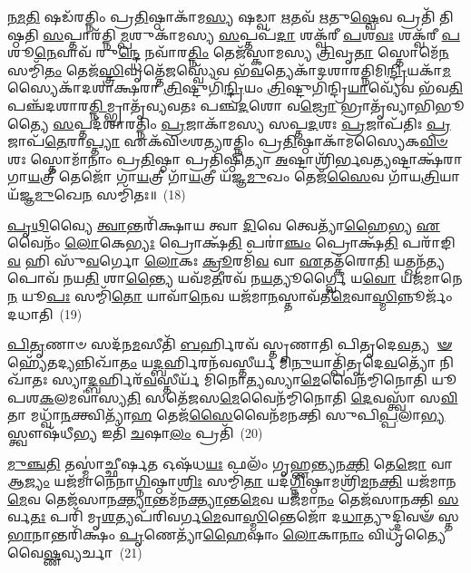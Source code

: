 \-\ul{𑌨}\-\-\ul{𑌮}\-\-\ul{𑌤𑌿} 𑌷𑌡᳴𑌰𑌤𑍍𑌨𑌿𑌂 𑌪𑍍𑌰\-\ul{𑌤𑌿}\-𑌷𑍍𑌠𑌾𑌕𑌾᳴𑌮\-\ul{𑌸𑍍𑌯} 𑌷𑌡𑍍𑌵𑌾 \ul{𑌋}\-𑌤𑌵᳴ \ul{𑌋}\-𑌤𑍁\-\ul{𑌷𑍍𑌵𑍇}\-𑌵 𑌪𑍍𑌰𑌤𑌿᳴ 𑌤𑌿𑌷𑍍𑌠𑌤𑌿 \ul{𑌸}\-𑌪𑍍𑌤𑌾𑌰᳴𑌤𑍍𑌨𑌿\-\ul{𑌮𑍍𑌪}\-𑌶𑍁𑌕𑌾᳴𑌮𑌸𑍍𑌯 \ul{𑌸}\-𑌪𑍍𑌤𑌪᳴\-\ul{𑌦𑌾} 𑌶𑌕𑍍𑌵᳴𑌰𑍀 \ul{𑌪}\-𑌶\-\ul{𑌵𑌃} 𑌶𑌕𑍍𑌵᳴𑌰𑍀 \ul{𑌪}\-𑌶𑍂\-\ul{𑌨𑍇}\-𑌵𑌾𑌵᳴ 𑌰𑍁\-\ul{𑌨𑍍𑌦𑍍𑌧𑍇} 𑌨𑌵𑌾᳴𑌰\-\ul{𑌤𑍍𑌨𑌿𑌂} 𑌤𑍇𑌜᳴𑌸𑍍𑌕𑌾𑌮𑌸𑍍𑌯 \ul{𑌤𑍍𑌰𑌿}\-𑌵𑍃\-\ul{𑌤𑌾} 𑌸𑍍𑌤𑍋𑌮𑍇᳴\-\ul{𑌨} 𑌸𑌮𑍍𑌮𑌿᳴\-\ul{𑌤𑌂} 𑌤𑍇𑌜᳴\-\ul{𑌸𑍍𑌤𑍍𑌰𑌿}\-𑌵𑍃𑌤𑍍𑌤𑍇᳴\-\ul{𑌜}\-𑌸𑍍𑌵𑍍𑌯𑍇᳴𑌵 𑌭᳴\-\ul{𑌵}\-𑌤𑍍𑌯𑍇𑌕𑌾᳴\-𑌦𑌶𑌾𑌰𑌤𑍍𑌨𑌿\-𑌮𑌿\-\ul{𑌨𑍍𑌦𑍍𑌰𑌿}\-𑌯𑌕𑌾᳴\-\ul{𑌮}\-𑌸𑍍𑌯𑍈𑌕𑌾᳴\-𑌦𑌶𑌾𑌕𑍍𑌷𑌰𑌾 \ul{𑌤𑍍𑌰𑌿}\-𑌷𑍍𑌟𑍁𑌗𑌿᳴\-\ul{𑌨𑍍𑌦𑍍𑌰𑌿}\-𑌯𑌂 \ul{𑌤𑍍𑌰𑌿}\-𑌷𑍍𑌟𑍁𑌗𑌿᳴𑌨𑍍𑌦𑍍𑌰𑌿\-\ul{𑌯𑌾}\-𑌵𑍍𑌯𑍇᳴𑌵 𑌭᳴𑌵\-\ul{𑌤𑌿} 𑌪𑌞𑍍𑌚᳴𑌦𑌶𑌾𑌰\-\ul{𑌤𑍍𑌨𑌿}\-𑌮𑍍𑌭𑍍𑌰𑌾𑌤𑍃᳴𑌵𑍍𑌯𑌵𑌤𑌃 𑌪𑌞𑍍𑌚\-\ul{𑌦}\-𑌶𑍋 𑌵\-\ul{𑌜𑍍𑌰𑍋} 𑌭𑍍𑌰𑌾𑌤𑍃᳴𑌵𑍍𑌯𑌾𑌭𑌿𑌭𑍂𑌤𑍍𑌯𑍈 \ul{𑌸}\-𑌪𑍍𑌤𑌦᳴𑌶𑌾𑌰𑌤𑍍𑌨𑌿𑌂 \ul{𑌪𑍍𑌰}\-𑌜𑌾𑌕𑌾᳴𑌮𑌸𑍍𑌯 𑌸𑌪𑍍𑌤\-\ul{𑌦}\-𑌶𑌃 \ul{𑌪𑍍𑌰}\-𑌜𑌾𑌪᳴𑌤𑌿𑌃 \ul{𑌪𑍍𑌰}\-𑌜𑌾𑌪᳴\-\ul{𑌤𑍇}\-𑌰𑌾\-\ul{𑌪𑍍𑌤𑍍𑌯𑌾} 𑌏𑌕᳴𑌵𑌿𑍞𑌶𑌤𑍍𑌯𑌰𑌤𑍍𑌨𑌿𑌂 𑌪𑍍𑌰\-\ul{𑌤𑌿}\-𑌷𑍍𑌠𑌾𑌕𑌾᳴𑌮𑌸𑍍𑌯𑍈𑌕\-\-\ul{𑌵𑌿}\-\-\ul{𑍞}\-𑌶𑌃 𑌸𑍍𑌤𑍋𑌮𑌾᳴𑌨𑌾𑌂 𑌪𑍍𑌰\-\ul{𑌤𑌿}\-𑌷𑍍𑌠𑌾 𑌪𑍍𑌰𑌤𑌿᳴𑌷𑍍𑌠𑌿𑌤𑍍𑌯𑌾 \ul{𑌅}\-𑌷𑍍𑌟𑌾𑌶𑍍𑌰𑌿᳴𑌰𑍍𑌭𑌵\-\ul{𑌤𑍍𑌯}\-𑌷𑍍𑌟𑌾𑌕𑍍𑌷᳴𑌰𑌾 𑌗𑌾\-\ul{𑌯}\-𑌤𑍍𑌰𑍀 𑌤𑍇𑌜𑍋᳴ 𑌗𑌾\-\ul{𑌯}\-𑌤𑍍𑌰𑍀 𑌗𑌾᳴\-\ul{𑌯}\-𑌤𑍍𑌰𑍀 𑌯᳴𑌜𑍍𑌞\-\ul{𑌮𑍁}\-𑌖𑌂 𑌤𑍇𑌜᳴\-\ul{𑌸𑍈}\-𑌵 𑌗𑌾᳴𑌯\-\ul{𑌤𑍍𑌰𑌿}\-𑌯𑌾 𑌯᳴𑌜𑍍𑌞\-\ul{𑌮𑍁}\-𑌖𑍇\-\ul{𑌨} 𑌸𑌮𑍍𑌮𑌿᳴𑌤𑌃॥~(18)

{\anuvakamend[{\-\ul{𑌜𑍁}\-\-\ul{𑌷𑍇} 𑌸𑌤𑍇᳴𑌜\-\ul{𑌸}\-𑌮𑌨᳴𑌕𑍍𑌷𑌸𑌙𑍍𑌗𑌂 𑌬𑌹𑍁\-\ul{𑌶𑌾}\-𑌖𑌂 𑌵𑍃᳴𑌶𑍍𑌚𑍇\-\ul{𑌦𑍇}\-𑌷 𑌵𑍈 \ul{𑌯}\-𑌜𑍍𑌞 𑌉𑌪𑍈᳴\-\ul{𑌨}\-𑌮𑍁𑌤𑍍𑌤᳴𑌰𑍋 \ul{𑌯}\-𑌜𑍍𑌞 𑌆\-\ul{𑌪𑍍𑌤𑍍𑌯𑌾} 𑌏\-\ul{𑌕𑌾}\-𑌨𑍍𑌨𑌵𑌿𑍞᳴\-\ul{𑌶}\-𑌤𑌿𑌶𑍍𑌚᳴}]}%

\-\ul{𑌪𑍃}\-\-\ul{𑌥𑌿}\-𑌵𑍍𑌯𑍈 \ul{𑌤𑍍𑌵𑌾}\-𑌨𑍍𑌤𑌰𑌿᳴𑌕𑍍𑌷𑌾𑌯 𑌤𑍍𑌵𑌾 \ul{𑌦𑌿}\-𑌵𑍇 𑌤𑍍𑌵𑍇𑌤𑍍𑌯𑌾᳴\-\ul{𑌹𑍈}\-𑌭𑍍𑌯 \ul{𑌏}\-𑌵𑍈𑌨𑌂᳴ \ul{𑌲𑍋}\-𑌕𑍇\-\ul{𑌭𑍍𑌯𑌃} 𑌪𑍍𑌰𑍋𑌕𑍍𑌷᳴\-\ul{𑌤𑌿} 𑌪𑌰𑌾॑\-\ul{𑌞𑍍𑌚𑌂} 𑌪𑍍𑌰𑍋𑌕𑍍𑌷᳴\-\ul{𑌤𑌿} 𑌪𑌰𑌾᳴𑌙𑌿\-\ul{𑌵} 𑌹𑌿 𑌸𑍁᳴\-\ul{𑌵}\-𑌰𑍍𑌗𑍋 \ul{𑌲𑍋}\-𑌕𑌃 \ul{𑌕𑍍𑌰𑍂}\-𑌰𑌮𑌿᳴\-\ul{𑌵} 𑌵𑌾 \ul{𑌏}\-𑌤𑌤𑍍𑌕᳴𑌰𑍋\-\ul{𑌤𑌿} 𑌯𑌤𑍍𑌖𑌨᳴\-\ul{𑌤𑍍𑌯}\-𑌪𑍋𑌵᳴ 𑌨𑌯\-\ul{𑌤𑌿} 𑌶𑌾\-\ul{𑌨𑍍𑌤𑍍𑌯𑍈} 𑌯𑌵᳴𑌮\-\ul{𑌤𑍀}\-𑌰𑌵᳴ 𑌨\-\ul{𑌯}\-𑌤𑍍𑌯𑍂𑌰𑍍𑌗𑍍𑌵𑍈 𑌯\-\ul{𑌵𑍋} 𑌯𑌜᳴𑌮𑌾𑌨𑍇\-\ul{𑌨} 𑌯𑍂\-\ul{𑌪𑌃} 𑌸𑌮𑍍𑌮𑌿᳴\-\ul{𑌤𑍋} 𑌯𑌾𑌵𑌾᳴\-\ul{𑌨𑍇}\-𑌵 𑌯𑌜᳴𑌮𑌾\-\ul{𑌨}\-𑌸𑍍𑌤𑌾𑌵᳴𑌤𑍀\-\ul{𑌮𑍇}\-𑌵𑌾\-\ul{𑌸𑍍𑌮𑌿}\-𑌨𑍍𑌨𑍂𑌰𑍍𑌜𑌂᳴ 𑌦𑌧𑌾𑌤𑌿~(19)

\-\ul{𑌪𑌿}\-\-\ul{𑌤𑍃}\-𑌣𑌾𑍞 𑌸𑌦᳴𑌨\-\ul{𑌮}\-𑌸𑍀𑌤𑌿᳴ \ul{𑌬}\-𑌰𑍍\mbox{}𑌹𑌿𑌰𑌵᳴ 𑌸𑍍𑌤𑍃𑌣𑌾𑌤𑌿 𑌪𑌿𑌤𑍃𑌦𑍇\-\ul{𑌵}\-𑌤𑍍𑌯 \-\ul{𑍟} 𑌹𑍍𑌯𑍇᳴𑌤𑌦𑍍𑌯𑌨𑍍𑌨𑌿𑌖𑌾᳴\-\ul{𑌤𑌂} 𑌯\-\ul{𑌦𑍍𑌬}\-𑌰𑍍\mbox{}𑌹𑌿𑌰𑌨᳴𑌵𑌸𑍍𑌤𑍀𑌰𑍍𑌯 𑌮𑌿\-\ul{𑌨𑍁}\-𑌯𑌾𑌤𑍍𑌪𑌿᳴𑌤𑍃𑌦𑍇\-\ul{𑌵}\-𑌤𑍍𑌯𑍋᳴ 𑌨𑌿𑌖𑌾᳴𑌤𑌃 𑌸𑍍𑌯𑌾\-\ul{𑌦𑍍𑌬}\-𑌰𑍍\mbox{}𑌹𑌿𑌰᳴\-\ul{𑌵}\-𑌸𑍍𑌤𑍀𑌰𑍍𑌯᳴ 𑌮𑌿𑌨𑍋\-\ul{𑌤𑍍𑌯}\-𑌸𑍍𑌯𑌾\-\ul{𑌮𑍇}\-𑌵𑍈𑌨᳴𑌮𑍍𑌮𑌿𑌨𑍋𑌤𑌿 𑌯𑍂𑌪𑌶\-\ul{𑌕}\-𑌲𑌮𑌵𑌾॑𑌸𑍍𑌯\-\ul{𑌤𑌿} 𑌸𑌤𑍇᳴𑌜𑌸\-\ul{𑌮𑍇}\-𑌵𑍈𑌨᳴𑌮𑍍𑌮𑌿𑌨𑍋𑌤𑌿 \ul{𑌦𑍇}\-𑌵𑌸𑍍𑌤𑍍𑌵𑌾᳴ 𑌸\-\ul{𑌵𑌿}\-𑌤𑌾 𑌮𑌧𑍍𑌵𑌾᳴\-\ul{𑌨}\-𑌕𑍍𑌤𑍍𑌵𑌿𑌤𑍍𑌯𑌾᳴\-\ul{𑌹} 𑌤𑍇𑌜᳴\-\ul{𑌸𑍈}\-𑌵𑍈𑌨᳴𑌮𑌨𑌕𑍍𑌤𑌿 𑌸𑍁𑌪𑌿\-\ul{𑌪𑍍𑌪}\-𑌲𑌾\-\ul{𑌭𑍍𑌯}\-𑌸𑍍𑌤𑍍𑌵𑍗𑌷᳴𑌧𑍀\-\ul{𑌭𑍍𑌯} 𑌇𑌤𑌿᳴ \ul{𑌚}\-𑌷𑌾\-\ul{𑌲𑌂} 𑌪𑍍𑌰𑌤𑌿᳴~(20)

\-\ul{𑌮𑍁}\-\-\ul{𑌞𑍍𑌚}\-\-\ul{𑌤𑌿} 𑌤𑌸𑍍𑌮𑌾॑𑌚𑍍𑌛𑍀𑌰𑍍\mbox{}\-\ul{𑌷}\-𑌤 𑌓𑌷᳴𑌧\-\ul{𑌯𑌃} 𑌫𑌲𑌂᳴ 𑌗𑍃𑌹𑍍𑌣\-\ul{𑌨𑍍𑌤𑍍𑌯}\-𑌨\-\ul{𑌕𑍍𑌤𑌿} 𑌤𑍇\-\ul{𑌜𑍋} 𑌵𑌾 𑌆\-\ul{𑌜𑍍𑌯𑌂} 𑌯𑌜᳴𑌮𑌾𑌨𑍇𑌨𑌾\-\ul{𑌗𑍍𑌨𑌿}\-𑌷𑍍𑌠𑌾\-\ul{𑌶𑍍𑌰𑌿𑌃} 𑌸𑌮𑍍𑌮𑌿᳴\-\ul{𑌤𑌾} 𑌯𑌦᳴\-\ul{𑌗𑍍𑌨𑌿}\-𑌷𑍍𑌠𑌾\-𑌮𑌶𑍍𑌰𑌿᳴\-\ul{𑌮}\-𑌨\-\ul{𑌕𑍍𑌤𑌿} 𑌯𑌜᳴𑌮𑌾𑌨\-\ul{𑌮𑍇}\-𑌵 𑌤𑍇𑌜᳴𑌸𑌾𑌨\-\ul{𑌕𑍍𑌤𑍍𑌯𑌾}\-𑌨𑍍𑌤𑌮᳴𑌨\-\ul{𑌕𑍍𑌤𑍍𑌯𑌾}\-𑌨𑍍𑌤\-\ul{𑌮𑍇}\-𑌵 𑌯𑌜᳴𑌮𑌾\-\ul{𑌨𑌂} 𑌤𑍇𑌜᳴𑌸𑌾𑌨𑌕𑍍𑌤𑌿 \ul{𑌸}\-𑌰𑍍𑌵\-\ul{𑌤𑌃} 𑌪𑌰𑌿᳴ 𑌮𑍃\-\ul{𑌶}\-𑌤𑍍𑌯𑌪᳴𑌰𑌿𑌵𑌰𑍍𑌗\-\ul{𑌮𑍇}\-𑌵𑌾\-\-\ul{𑌸𑍍𑌮𑌿}\-𑌨𑍍𑌤𑍇𑌜𑍋᳴ 𑌦\-\ul{𑌧𑌾}\-𑌤𑍍𑌯𑍁𑌦𑍍𑌦𑌿𑌵𑍟᳴ 𑌸𑍍𑌤\-\ul{𑌭𑌾}\-𑌨𑌾𑌨𑍍𑌤𑌰𑌿᳴𑌕𑍍𑌷𑌂 \ul{𑌪𑍃}\-𑌣𑍇𑌤𑍍𑌯𑌾᳴\-\ul{𑌹𑍈}\-𑌷𑌾𑌂 \ul{𑌲𑍋}\-𑌕𑌾\-\ul{𑌨𑌾𑌂} 𑌵𑌿𑌧𑍃᳴𑌤𑍍𑌯𑍈 𑌵𑍈\-\ul{𑌷𑍍𑌣}\-𑌵𑍍𑌯𑌰𑍍𑌚𑌾~(21)

